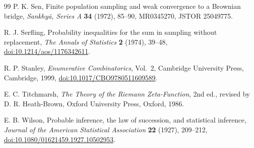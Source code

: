 \documentclass[11pt,reqno]{amsart}
\numberwithin{equation}{section}
\theoremstyle{plain}
\theoremstyle{definition}
\theoremstyle{remark}
\begin{document}
\begin{thebibliography}{99}
P. K. Sen,
\newblock Finite population sampling and weak convergence to a Brownian
bridge,
\newblock \emph{Sankhy\=a, Series A} \textbf{34} (1972), 85--90,
\newblock MR0345270, JSTOR 25049775.

R. J. Serfling,
\newblock Probability inequalities for the sum in sampling without
replacement,
\newblock \emph{The Annals of Statistics} \textbf{2} (1974), 39--48,
\newblock \href{https://doi.org/10.1214/aos/1176342611}
{doi:10.1214/aos/1176342611}.

R. P. Stanley,
\newblock \emph{Enumerative Combinatorics}, Vol.~2,
\newblock Cambridge University Press, Cambridge, 1999,
\newblock \href{https://doi.org/10.1017/CBO9780511609589}
{doi:10.1017/CBO9780511609589}.

E. C. Titchmarsh,
\newblock \emph{The Theory of the Riemann Zeta-Function}, 2nd ed.,
\newblock revised by D. R. Heath-Brown,
\newblock Oxford University Press, Oxford, 1986.

E. B. Wilson,
\newblock Probable inference, the law of succession, and statistical
inference,
\newblock \emph{Journal of the American Statistical Association}
\textbf{22} (1927), 209--212,
\newblock \href{https://doi.org/10.1080/01621459.1927.10502953}
{doi:10.1080/01621459.1927.10502953}.

\end{thebibliography}
\end{document}
